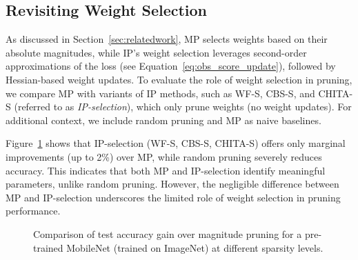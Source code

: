 \subsection{Revisiting Weight Selection}
As discussed in Section~\ref{sec:relatedwork}, MP selects weights based on their absolute magnitudes, while IP's weight selection leverages second-order approximations of the loss (see Equation~\ref{eq:obs_score_update}),  followed by Hessian-based weight updates. To evaluate the role of weight selection in pruning, we compare MP with variants of IP methods, such as WF-S, CBS-S, and CHITA-S (referred to as \textit{IP-selection}), which only prune weights (no weight updates). For additional context, we include random pruning and MP as naive baselines.

Figure~\ref{fig:obs_selection} shows that IP-selection (WF-S, CBS-S, CHITA-S) offers only marginal improvements (up to 2\%) over MP, while random pruning severely reduces accuracy. This indicates that both MP and IP-selection identify meaningful parameters, unlike random pruning. However, the negligible difference between MP and IP-selection underscores the limited role of weight selection in pruning performance.



\begin{figure}[ht]
\centering
{}
\caption{Comparison of test accuracy gain over magnitude pruning for a pre-trained MobileNet (trained on ImageNet) at different sparsity levels.}
\label{fig:obs_selection}
\end{figure}


